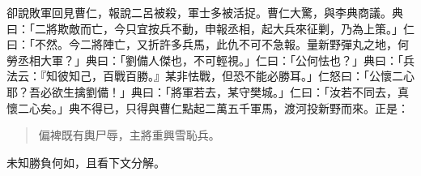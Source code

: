 卻說敗軍回見曹仁，報說二呂被殺，軍士多被活捉。曹仁大驚，與李典商議。典曰：「二將欺敵而亡，今只宜按兵不動，申報丞相，起大兵來征剿，乃為上策。」仁曰：「不然。今二將陣亡，又折許多兵馬，此仇不可不急報。量新野彈丸之地，何勞丞相大軍？」典曰：「劉備人傑也，不可輕視。」仁曰：「公何怯也？」典曰：「兵法云：『知彼知己，百戰百勝。』某非怯戰，但恐不能必勝耳。」仁怒曰：「公懷二心耶？吾必欲生擒劉備！」典曰：「將軍若去，某守樊城。」仁曰：「汝若不同去，真懷二心矣。」典不得已，只得與曹仁點起二萬五千軍馬，渡河投新野而來。正是：

\begin{quote}
偏裨既有輿尸辱，主將重興雪恥兵。
\end{quote}

未知勝負何如，且看下文分解。
